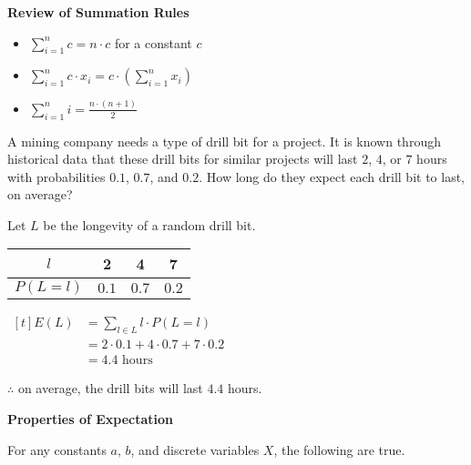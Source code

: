 \textbf{Review of Summation Rules}

\begin{itemize}
    \item $\sum_{i=1}^n c = n \cdot c$ for a constant $c$
    \item $\sum_{i=1}^n c \cdot x_i = c \cdot \left( \sum_{i=1}^n x_i \right)$
    \item $\sum_{i=1}^n i = \frac{n \cdot (n+1)}{2}$
\end{itemize}

\begin{example}
    A mining company needs a type of drill bit for a project. It is known through historical data that these drill bits for similar projects will last $2$, $4$, or $7$ hours with probabilities $0.1$, $0.7$, and $0.2$. How long do they expect each drill bit to last, on average?

    Let $L$ be the longevity of a random drill bit.

    \begin{center}
        \begin{tabular}{c | c c c}
            $l$        & 2     & 4     & 7     \\
            \hline
            $P(L = l)$ & $0.1$ & $0.7$ & $0.2$
        \end{tabular}
    \end{center}

    $\begin{aligned}[t]
        E(L) & = \sum_{l \in L} l \cdot P(L = l)         \\
             & = 2 \cdot 0.1 + 4 \cdot 0.7 + 7 \cdot 0.2 \\
             & = 4.4 \text{ hours}
    \end{aligned}$

    $\therefore$ on average, the drill bits will last $4.4$ hours.
\end{example}

\textbf{Properties of Expectation}

For any constants $a$, $b$, and discrete variables $X$, the following are true.

